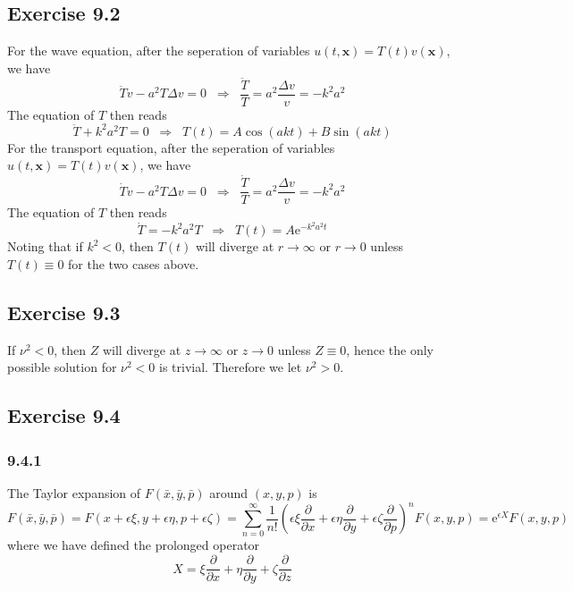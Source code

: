 \documentclass[]{ctexart}
\begin{document}
\subsection{Exercise 9.2}
For the wave equation, after the seperation of variables $u(t,\mathbf x)=T(t)v(\mathbf x)$, we have 
\begin{equation*}
\ddot Tv-a^2T\Delta v=0\;\;\Rightarrow\;\;\frac{\ddot T}{T}=a^2\frac{\Delta v}{v}=-k^2a^2
\end{equation*}
The equation of $T$ then reads 
\begin{equation*}
\ddot T+k^2a^2 T=0\;\;\Rightarrow\;\;T(t)=A\cos(akt)+B\sin(akt)
\end{equation*}
For the transport equation, after the seperation of variables $u(t,\mathbf x)=T(t)v(\mathbf x)$, we have
\begin{equation*}
\dot Tv-a^2T\Delta v=0\;\;\Rightarrow\;\;\frac{\dot T}{T}=a^2\frac{\Delta v}{v}=-k^2a^2
\end{equation*}
The equation of $T$ then reads 
\begin{equation*}
\dot T=-k^2a^2 T\;\;\Rightarrow\;\;T(t)=A\mathrm{e}^{-k^2a^2 t}
\end{equation*}
Noting that if $k^2<0$, then $T(t)$ will diverge at $r\to\infty$ or $r\to 0$ unless $T(t)\equiv 0$ for the two cases above. 
\subsection{Exercise 9.3}
If $\nu^2<0$, then $Z$ will diverge at $z\to\infty$ or $z\to 0$ unless $Z\equiv 0$, hence the only possible solution for $\nu^2<0$ is trivial. 
Therefore we let $\nu^2>0$. 
\subsection{Exercise 9.4}
\subsubsection*{9.4.1}
The Taylor expansion of $F(\bar x,\bar y,\bar p)$ around $(x,y,p)$ is 
\begin{equation*}
F(\bar x,\bar y,\bar p)=F(x+\epsilon\xi,y+\epsilon\eta, p+\epsilon\zeta)=\sum_{n=0}^{\infty}\frac{1}{n!}\left(\epsilon\xi\frac{\partial}{\partial x}+\epsilon\eta\frac{\partial}{\partial y}+\epsilon\zeta\frac{\partial}{\partial p}\right)^nF(x,y,p)=\mathrm{e}^{\epsilon X}F(x,y,p)
\end{equation*}
where we have defined the prolonged operator 
\begin{equation*}
X=\xi\frac{\partial}{\partial x}+\eta\frac{\partial}{\partial y}+\zeta\frac{\partial}{\partial z}
\end{equation*}
\end{document}

